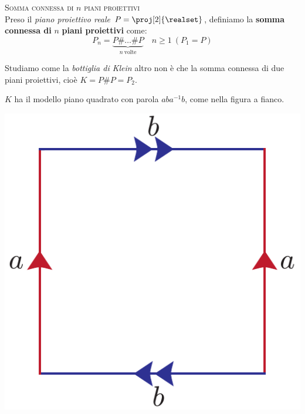\begin{define}\textsc{Somma connessa di $n$ piani proiettivi}\\
	Preso il \textit{piano proiettivo reale} $P=\proj[2]{\realset}$, definiamo la \textbf{somma connessa di} $n$ \textbf{piani proiettivi} come:
	\begin{equation*}
		P_n=\underbrace{P\# \ldots\# P}_{n\ \text{volte}}\quad n\geq 1\ \left(P_1=P\right)
	\end{equation*}
\vspace{-3mm}
\end{define}
\begin{observe}	Studiamo come la \textit{bottiglia di Klein} altro non è che la somma connessa di due piani proiettivi, cioè $K=P\# P=P_2$.\\
	\begin{minipage}{.75\linewidth}
		$K$ ha il modello piano quadrato con parola $aba^{-1}b$, come nella figura a fianco.
	\end{minipage}
	\begin{minipage}{.24\linewidth}
		\begin{center}
			\includegraphics[trim=0cm 0cm 0cm 0cm, clip, scale=0.3]{images/klein.pdf}
		\end{center}
	\end{minipage}\\

\end{observe}
